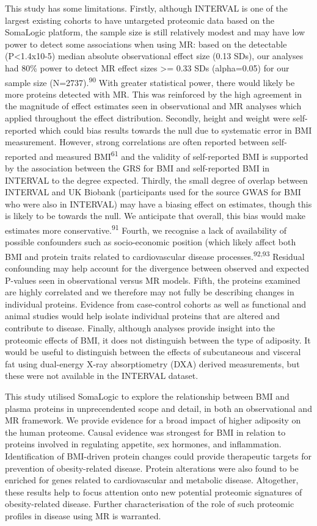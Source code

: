 \documentclass[11pt,twoside]{bristolthesis}
\begin{document}
This study has some limitations. Firstly, although INTERVAL is one of the largest existing cohorts to have untargeted proteomic data based on the SomaLogic platform, the sample size is still relatively modest and may have low power to detect some associations when using MR: based on the detectable (P\textless1.4x10-5) median absolute observational effect size (0.13 SDs), our analyses had 80\% power to detect MR effect sizes \textgreater= 0.33 SDs (alpha=0.05) for our sample size (N=2737).\textsuperscript{90} With greater statistical power, there would likely be more proteins detected with MR. This was reinforced by the high agreement in the magnitude of effect estimates seen in observational and MR analyses which applied throughout the effect distribution. Secondly, height and weight were self-reported which could bias results towards the null due to systematic error in BMI measurement. However, strong correlations are often reported between self-reported and measured BMI\textsuperscript{61} and the validity of self-reported BMI is supported by the association between the GRS for BMI and self-reported BMI in INTERVAL to the degree expected. Thirdly, the small degree of overlap between INTERVAL and UK Biobank (participants used for the source GWAS for BMI who were also in INTERVAL) may have a biasing effect on estimates, though this is likely to be towards the null. We anticipate that overall, this bias would make estimates more conservative.\textsuperscript{91} Fourth, we recognise a lack of availability of possible confounders such as socio-economic position (which likely affect both BMI and protein traits related to cardiovascular disease processes.\textsuperscript{92,93} Residual confounding may help account for the divergence between observed and expected P-values seen in observational versus MR models. Fifth, the proteins examined are highly correlated and we therefore may not fully be describing changes in individual proteins. Evidence from case-control cohorts as well as functional and animal studies would help isolate individual proteins that are altered and contribute to disease. Finally, although analyses provide insight into the proteomic effects of BMI, it does not distinguish between the type of adiposity. It would be useful to distinguish between the effects of subcutaneous and visceral fat using dual-energy X-ray absorptiometry (DXA) derived measurements, but these were not available in the INTERVAL dataset.

This study utilised SomaLogic to explore the relationship between BMI and plasma proteins in unprecendented scope and detail, in both an observational and MR framework. We provide evidence for a broad impact of higher adiposity on the human proteome. Causal evidence was strongest for BMI in relation to proteins involved in regulating appetite, sex hormones, and inflammation. Identification of BMI-driven protein changes could provide therapeutic targets for prevention of obesity-related disease. Protein alterations were also found to be enriched for genes related to cardiovascular and metabolic disease. Altogether, these results help to focus attention onto new potential proteomic signatures of obesity-related disease. Further characterisation of the role of such proteomic profiles in disease using MR is warranted.
\end{document}
